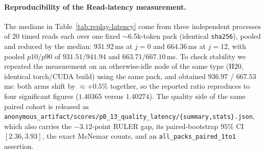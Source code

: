 %
%

\paragraph{Reproducibility of the Read-latency measurement.}
The medians in Table~\ref{tab:replay-latency} come from three independent processes
of $20$ timed reads each over one fixed $\sim$6.5k-token pack (identical
\texttt{sha256}), pooled and reduced by the median: $931.92$\,ms at $j{=}0$ and
$664.36$\,ms at $j{=}12$, with pooled $p10/p90$ of $931.51/941.94$ and
$663.71/667.10$\,ms. To check stability we repeated the measurement on an
otherwise-idle node of the same type (H20, identical torch/CUDA build) using the
same pack, and obtained $936.97$ / $667.53$\,ms: both arms shift by $\approx{+}0.5\%$
together, so the reported ratio reproduces to four significant figures
($1.40365$ versus $1.40274$). The quality side of the same paired cohort is
released as
\texttt{anonymous\_artifact/scores/p0\_13\_quality\_latency/\{summary,stats\}.json},
which also carries the $-3.12$-point RULER gap, its paired-bootstrap
$95\%$ CI $[2.36,3.93]$, the exact McNemar counts, and an
\texttt{all\_packs\_paired\_1to1} assertion.
